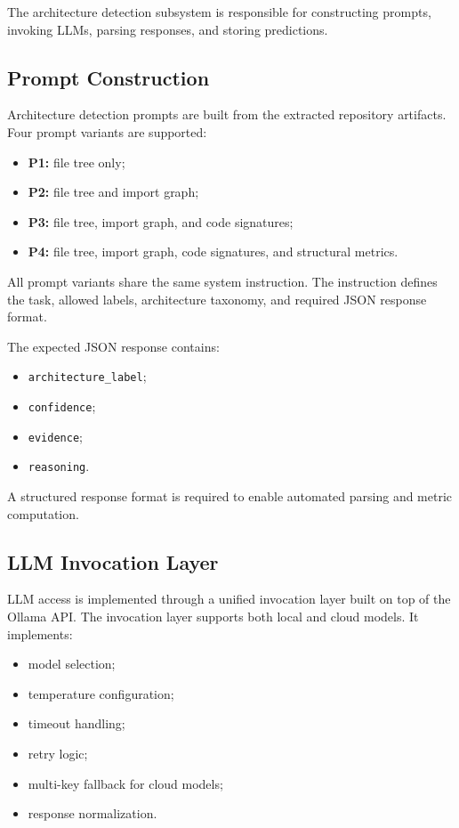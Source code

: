 The architecture detection subsystem is responsible for constructing prompts, invoking LLMs, parsing responses, and storing predictions.

\subsection{Prompt Construction}

Architecture detection prompts are built from the extracted repository artifacts. Four prompt variants are supported:

\begin{itemize}
    \item \textbf{P1:} file tree only;
    \item \textbf{P2:} file tree and import graph;
    \item \textbf{P3:} file tree, import graph, and code signatures;
    \item \textbf{P4:} file tree, import graph, code signatures, and structural metrics.
\end{itemize}

All prompt variants share the same system instruction. The instruction defines the task, allowed labels, architecture taxonomy, and required JSON response format.

The expected JSON response contains:

\begin{itemize}
    \item \texttt{architecture\_label};
    \item \texttt{confidence};
    \item \texttt{evidence};
    \item \texttt{reasoning}.
\end{itemize}

A structured response format is required to enable automated parsing and metric computation.

\subsection{LLM Invocation Layer}

LLM access is implemented through a unified invocation layer built on top of the Ollama API. The invocation layer supports both local and cloud models. It implements:

\begin{itemize}
    \item model selection;
    \item temperature configuration;
    \item timeout handling;
    \item retry logic;
    \item multi-key fallback for cloud models;
    \item response normalization.
\end{itemize}

